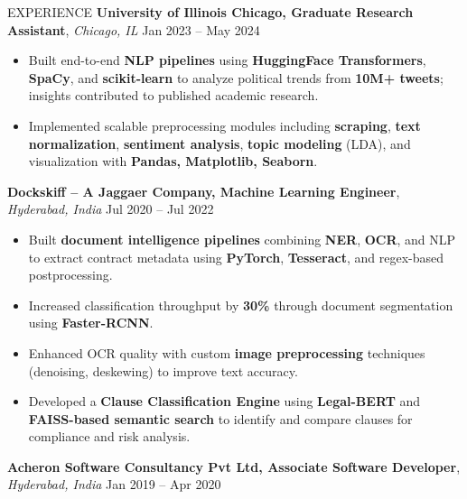 \documentclass{resume} %
\begin{document}
\begin{rSection}{EXPERIENCE}
\vspace{-0.4em}
\textbf{University of Illinois Chicago, Graduate Research Assistant}, \textit{Chicago, IL} \hfill Jan 2023 – May 2024
\vspace{-0.5em}  %

\begin{itemize}
\itemsep -3pt {}
    \item Built end-to-end \textbf{NLP pipelines} using \textbf{HuggingFace Transformers}, \textbf{SpaCy}, and \textbf{scikit-learn} to analyze political trends from \textbf{10M+ tweets}; insights contributed to published academic research.
    \item Implemented scalable preprocessing modules including \textbf{scraping}, \textbf{text normalization}, \textbf{sentiment analysis}, \textbf{topic modeling} (LDA), and visualization with \textbf{Pandas, Matplotlib, Seaborn}.
\end{itemize}


\vspace{-0.4em}
\textbf{Dockskiff – A Jaggaer Company, Machine Learning Engineer}, \textit{Hyderabad, India} \hfill Jul 2020 – Jul 2022
\vspace{-0.5em}  %

\begin{itemize}
\itemsep -3pt {}
    \item Built \textbf{document intelligence pipelines} combining \textbf{NER}, \textbf{OCR}, and NLP to extract contract metadata using \textbf{PyTorch}, \textbf{Tesseract}, and regex-based postprocessing.
    \item Increased classification throughput by \textbf{30\%} through document segmentation using \textbf{Faster-RCNN}.
    \item Enhanced OCR quality with custom \textbf{image preprocessing} techniques (denoising, deskewing) to improve text accuracy.
     \item Developed a \textbf{Clause Classification Engine} using \textbf{Legal-BERT} and \textbf{FAISS-based semantic search} to identify and compare clauses for compliance and risk analysis.
\end{itemize}


\vspace{-0.4em}
\textbf{Acheron Software Consultancy Pvt Ltd, Associate Software Developer}, \textit{Hyderabad, India} \hfill Jan 2019 – Apr 2020
\vspace{-0.5em}  %


\end{rSection}
\end{document}
